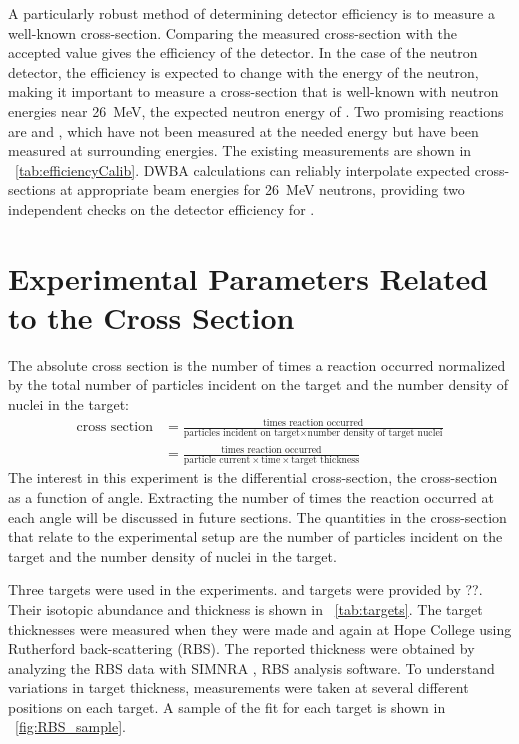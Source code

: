 A particularly robust method of determining detector efficiency is to measure a well-known cross-section.  Comparing the measured cross-section with the accepted value gives the efficiency of the detector.  In the case of the neutron detector, the efficiency is expected to change with the energy of the neutron, making it important to measure a cross-section that is well-known with neutron energies near 26~MeV, the expected neutron energy of \reaction.  Two promising reactions are \DuReaction and \MgReaction, which have not been measured at the needed energy but have been measured at surrounding energies.  The existing measurements are shown in {\tab}~\ref{tab:efficiencyCalib}. DWBA calculations can reliably interpolate expected cross-sections at appropriate beam energies for 26~MeV neutrons, providing two independent checks on the detector efficiency for \reaction.



\section{Experimental Parameters Related to the Cross Section}

The absolute cross section is the number of times a reaction occurred normalized by the total number of particles incident on the target and the number density of nuclei in the target:
\begin{align}
\text{cross section} &= \frac{\text{times reaction occurred}}{\text{particles incident on target} \times \text{number density of target nuclei}} \\
                     &= \frac{\text{times reaction occurred}}{\text{particle current} \times \text{time} \times \text{target thickness}}
\label{eq:cross_section}
\end{align}
The interest in this experiment is the differential cross-section, the cross-section as a function of angle.  Extracting the number of times the reaction occurred at each angle will be discussed in future sections.  The quantities in the cross-section that relate to the experimental setup are the number of particles incident on the target and the number density of nuclei in the target.

Three targets were used in the experiments.  \GeTargets and  targets were provided by ??.  Their isotopic abundance and thickness is shown in {\tab}~\ref{tab:targets}.  The target thicknesses were measured when they were made and again at Hope College using Rutherford back-scattering (RBS).  The reported thickness were obtained by analyzing the RBS data with SIMNRA \cite{SIMNRA}, RBS analysis software.  To understand variations in target thickness, measurements were taken at several different positions on each target.  A sample of the fit for each target is shown in {\fig}~\ref{fig:RBS_sample}.

